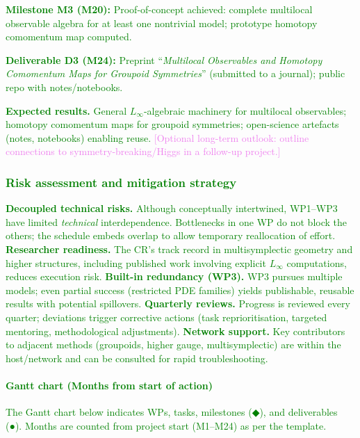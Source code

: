 \documentclass[11pt,draftproposal]{msca-pf}
\begin{document}
\textcolor{green}{\textbf{Milestone M3 (M20):} Proof-of-concept achieved: complete multilocal observable algebra for at least one nontrivial model; prototype homotopy comomentum map computed.}

\textcolor{green}{\textbf{Deliverable D3 (M24):} Preprint ``\emph{Multilocal Observables and Homotopy Comomentum Maps for Groupoid Symmetries}'' (submitted to a journal); public repo with notes/notebooks.}

\textcolor{green}{\textbf{Expected results.} General $L_\infty$-algebraic machinery for multilocal observables; homotopy comomentum maps for groupoid symmetries; open-science artefacts (notes, notebooks) enabling reuse.}
\textcolor{violet}{[Optional long-term outlook: outline connections to symmetry-breaking/Higgs in a follow-up project.]}

\subsubsection*{\textcolor{green}{Risk assessment and mitigation strategy}}
\textcolor{green}{\textbf{Decoupled technical risks.} Although conceptually intertwined, WP1–WP3 have limited \emph{technical} interdependence. Bottlenecks in one WP do not block the others; the schedule embeds overlap to allow temporary reallocation of effort.}
\textcolor{green}{\textbf{Researcher readiness.} The CR’s track record in multisymplectic geometry and higher structures, including published work involving explicit $L_\infty$ computations, reduces execution risk.}
\textcolor{green}{\textbf{Built-in redundancy (WP3).} WP3 pursues multiple models; even partial success (restricted PDE families) yields publishable, reusable results with potential spillovers.}
\textcolor{green}{\textbf{Quarterly reviews.} Progress is reviewed every quarter; deviations trigger corrective actions (task reprioritisation, targeted mentoring, methodological adjustments).}
\textcolor{green}{\textbf{Network support.} Key contributors to adjacent methods (groupoids, higher gauge, multisymplectic) are within the host/network and can be consulted for rapid troubleshooting.}

\paragraph{\textcolor{green}{Gantt chart (Months from start of action)}}
\textcolor{green}{The Gantt chart below indicates WPs, tasks, milestones (◆), and deliverables (●). Months are counted from project start (M1–M24) as per the template.}
\end{document}
